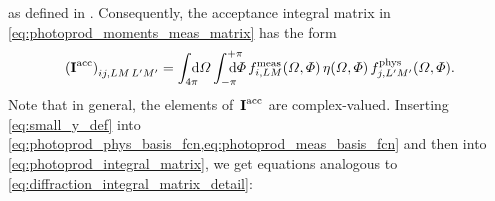 as defined in
.
Consequently, the acceptance integral matrix in
\cref{eq:photoprod_moments_meas_matrix} has the form
\begin{equation}
  \label{eq:photoprod_integral_matrix}
  \rBrk[0]{\mat{I}^\text{acc}}_{i j, L M\, L' M'}
  = \int_{4 \pi}\!\!\!\! \dif{\Omega} \int_{-\pi}^{+\pi}\hspace{-1.2em} \dif{\Phi}\,
  f_{i, L M}^\text{meas}(\Omega, \Phi)\,
  \eta(\Omega, \Phi)\,
  f_{j, L' M'}^\text{phys}(\Omega, \Phi).
\end{equation}
Note that in general, the elements of~$\bm{\mathrm{I}}^\text{acc}$ are
complex-valued.  Inserting \cref{eq:small_y_def} into
\cref{eq:photoprod_phys_basis_fcn,eq:photoprod_meas_basis_fcn} and then into
\cref{eq:photoprod_integral_matrix}, we get equations analogous to
\cref{eq:diffraction_integral_matrix_detail}:
